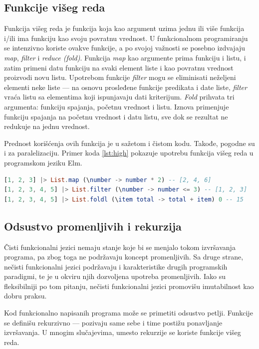 \documentclass[12pt,oneside]{memoir}
\begin{document}
\subsection{Funkcije višeg reda}
Funkcija višeg reda je funkcija koja kao argument uzima jednu ili više funkcija i/ili ima funkciju kao svoju povratnu vrednost. U funkcionalnom programiranju se intenzivno koriste ovakve funkcije, a po svojoj važnosti se posebno izdvajaju \textit{map}, \textit{filter} i \textit{reduce (fold)}.  Funkcija \textit{map} kao argumente prima funkciju i listu, i zatim primeni datu funkciju na svaki element liste i kao povratnu vrednost proizvodi novu listu. Upotrebom funkcije \textit{filter} mogu se eliminisati neželjeni elementi neke liste --- na osnovu prosleđene funkcije predikata i date liste, \textit{filter} vraća listu sa elementima koji ispunjavaju dati kriterijum. \textit{Fold} prihvata tri argumenta: funkciju spajanja, početnu vrednost i listu. Iznova primenjuje funkciju spajanja na početnu vrednost i datu listu, sve dok se rezultat ne redukuje na jednu vrednost. 
\par Prednost korišćenja ovih funkcija je u sažetom i čistom kodu. Takođe, pogodne su i za paralelizaciju. Primer koda \ref{lst:high} pokazuje upotrebu funkcija višeg reda u programskom jeziku Elm.


\begin{lstlisting}[language=elm, caption={Funkcije višeg reda},captionpos=b, label={lst:high}]
[1, 2, 3] |> List.map (\number -> number * 2) -- [2, 4, 6]
[1, 2, 3, 4, 5] |> List.filter (\number -> number <= 3) -- [1, 2, 3]
[1, 2, 3, 4, 5] |> List.foldl (\item total -> total + item) 0 -- 15
\end{lstlisting}

\subsection{Odsustvo promenljivih i rekurzija}
\par Čisti funkcionalni jezici nemaju stanje koje bi se menjalo tokom izvršavanja programa, pa zbog toga ne podržavaju koncept promenljivih. Sa druge strane, nečisti funkcionalni jezici podržavaju i karakteristike drugih programskih paradigmi, te je u okviru njih dozvoljena upotreba promenljivih. Iako su fleksibilniji po tom pitanju, nečisti funkcionalni jezici promovišu imutabilnost kao dobru praksu. 
\par Kod funkcionalno napisanih programa može se primetiti odsustvo petlji. Funkcije se definišu rekurzivno --- pozivaju same sebe i time postižu ponavljanje izvršavanja. U mnogim slučajevima, umesto rekurzije se koriste funkcije višeg reda.
\end{document}
